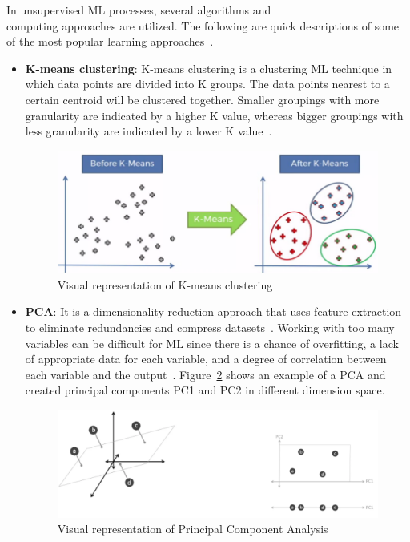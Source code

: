 In unsupervised \gls{ML} processes, several algorithms and\mbox{}\\ computing approaches are utilized. The following are quick descriptions of some of the most popular learning approaches~\cite{Chugh2018TypesKnow}.
\begin{itemize}
    \item \textbf{K-means clustering}: K-means clustering is a clustering \gls{ML} technique in which data points are divided into K groups. The data points nearest to a certain centroid will be clustered together. Smaller groupings with more granularity are indicated by a higher K value, whereas bigger groupings with less granularity are indicated by a lower K value~\cite{2020WhatIBMb}.
    
    \begin{figure}[htbp]
        \centering
        \includegraphics[width=0.65\linewidth]{Chapters/Figures/k-means.png}
        \caption{Visual representation of K-means clustering~\cite{Beaumont2020ImageMedium}}
        \label{fig:k-means}
    \end{figure}
    
    \item \textbf{\gls{PCA}}: It is a dimensionality reduction approach that uses feature extraction to eliminate redundancies and compress datasets~\cite{2020WhatIBMb}. Working with too many variables can be difficult for \gls{ML} since there is a chance of overfitting, a lack of appropriate data for each variable, and a degree of correlation between each variable and the output~\cite{Chugh2018TypesKnow}. Figure~\ref{fig:pca} shows an example of a \gls{PCA} and created principal components PC1 and PC2 in different dimension space.
    
    \begin{figure}[htbp]
        \centering
        \includegraphics[width=0.85\linewidth]{Chapters/Figures/pca.png}
        \caption{Visual representation of Principal Component Analysis~\cite{Sah2020MachineTypes}}
        \label{fig:pca}
    \end{figure}
    
\end{itemize}

